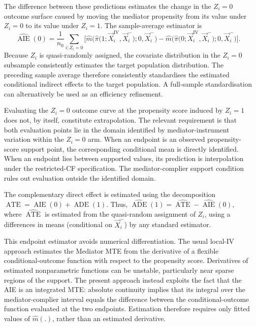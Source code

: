 The difference between these predictions estimates the change in the $Z_i=0$ outcome surface caused by moving the mediator propensity from its value under $Z_i=0$ to its value under $Z_i=1$.
The sample-average estimator is
\[ \widehat{\operatorname{AIE}}(0)
    =
    \frac{1}{n_0}
    \sum_{i:Z_i=0}
    \Bigg[
        \widehat m
        \Big(
            \widehat\pi
            \big(
                1;
                \vec X_i^{\mathrm{IV}},
                \vec X_i^-
            \big);
            0,
            \vec X_i^-
        \Big)
        -
        \widehat m
        \Big(
            \widehat\pi
            \big(
                0;
                \vec X_i^{\mathrm{IV}},
                \vec X_i^-
            \big);
            0,
            \vec X_i^-
        \Big)
    \Bigg].
\]
Because $Z_i$ is quasi-randomly assigned, the covariate distribution in the $Z_i=0$ subsample consistently estimates the target population distribution.
The preceding sample average therefore consistently standardises the estimated conditional indirect effects to the target population.
A full-sample standardisation can alternatively be used as an efficiency refinement.

Evaluating the $Z_i=0$ outcome curve at the propensity score induced by $Z_i=1$ does not, by itself, constitute extrapolation.
The relevant requirement is that both evaluation points lie in the domain identified by mediator-instrument variation within the $Z_i=0$ arm.
When an endpoint is an observed propensity-score support point, the corresponding conditional mean is directly identified.
When an endpoint lies between supported values, its prediction is interpolation under the restricted-CF specification.
The mediator-complier support condition rules out evaluation outside the identified domain.

The complementary direct effect is estimated using the decomposition
\(
    \operatorname{ATE}
    =
    \operatorname{AIE}(0)
    +
    \operatorname{ADE}(1)
\).
Thus,
\(
    \widehat{\operatorname{ADE}}(1)
    =
    \widehat{\operatorname{ATE}}
    -
    \widehat{\operatorname{AIE}}(0),
\)
where $\widehat{\operatorname{ATE}}$ is estimated from the quasi-random assignment of $Z_i$, using a differences in means (conditional on $\vec X_i^-$) by any standard estimator.

This endpoint estimator avoids numerical differentiation.
The usual local-IV approach estimates the Mediator MTE from the derivative of a flexible conditional-outcome function with respect to the propensity score.
Derivatives of estimated nonparametric functions can be unstable, particularly near sparse regions of the support.
The present approach instead exploits the fact that the AIE is an integrated MTE: absolute continuity implies that its integral over the mediator-complier interval equals the difference between the conditional-outcome function evaluated at the two endpoints.
Estimation therefore requires only fitted values of $\widehat m(.)$, rather than an estimated derivative.


